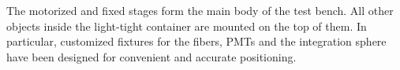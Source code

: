 \documentclass{JINST}
\begin{document}
The motorized and fixed stages form the main body of the test bench.
All other objects inside the light-tight container are mounted on the top of them.
In particular, customized fixtures for the fibers, PMTs and the integration sphere have been designed for convenient and accurate positioning.

\end{document}
